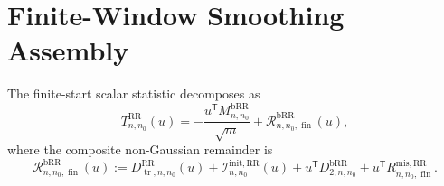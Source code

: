 
\section{Finite-Window Smoothing Assembly}

The finite-start scalar statistic decomposes as
\begin{equation}
T_{n,n_{0}}^{\mathrm{RR}}(u)
  = -\frac{u^{\mathsf{T}} M_{n,n_{0}}^{\mathrm{bRR}}}{\sqrt{m}}
    + \mathcal{R}_{n,n_{0}, \operatorname{fin}}^{\mathrm{bRR}}(u),
\label{eq:burn-full-decomp}
\end{equation}
where the composite non-Gaussian remainder is
\begin{equation}
\mathcal{R}_{n,n_{0}, \operatorname{fin}}^{\mathrm{bRR}}(u)
  := D_{\operatorname{tr}, n, n_{0}}^{\mathrm{RR}}(u)
     + \mathcal{I}_{n,n_{0}}^{\mathrm{init,RR}}(u)
     + u^{\mathsf{T}} D_{2,n,n_{0}}^{\mathrm{bRR}}
     + u^{\mathsf{T}} R_{n,n_{0}, \operatorname{fin}}^{\mathrm{mis,RR}}.
\label{eq:burn-composite-remainder}
\end{equation}

